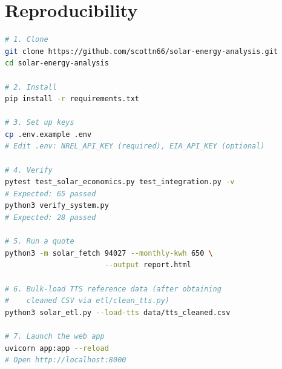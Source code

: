 \documentclass[10pt, conference]{IEEEtran}
\begin{document}
\section{Reproducibility}

\begin{lstlisting}[language=bash, basicstyle=\ttfamily\scriptsize]
# 1. Clone
git clone https://github.com/scottn66/solar-energy-analysis.git
cd solar-energy-analysis

# 2. Install
pip install -r requirements.txt

# 3. Set up keys
cp .env.example .env
# Edit .env: NREL_API_KEY (required), EIA_API_KEY (optional)

# 4. Verify
pytest test_solar_economics.py test_integration.py -v
# Expected: 65 passed
python3 verify_system.py
# Expected: 28 passed

# 5. Run a quote
python3 -m solar_fetch 94027 --monthly-kwh 650 \
                       --output report.html

# 6. Bulk-load TTS reference data (after obtaining
#    cleaned CSV via etl/clean_tts.py)
python3 solar_etl.py --load-tts data/tts_cleaned.csv

# 7. Launch the web app
uvicorn app:app --reload
# Open http://localhost:8000
\end{lstlisting}
\end{document}
